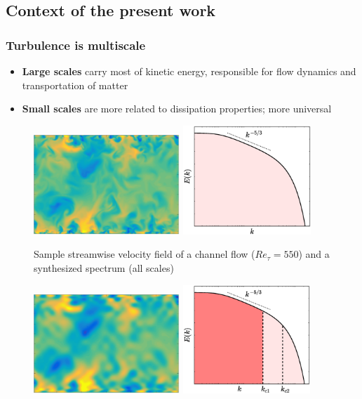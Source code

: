 \documentclass{beamer}
\let\olditem\item
\renewcommand{\item}{\setlength{\itemsep}{\fill}\olditem}
\begin{document}
\subsection[Context of the present work]{Context of the present work}
\begin{frame}
\frametitle{Turbulence is multiscale}
	\begin{itemize}
		\item \textbf{\color{red}Large scales} carry most of kinetic energy, responsible for flow dynamics and transportation of matter
		\item \textbf{\color{red}Small scales} are more related to dissipation properties; more universal
	\end{itemize}
	\begin{overprint}
	\begin{figure}
		\includegraphics[height=3.75cm,valign=t]{./figures/turbulence/Uorg.png}
		\includegraphics[height=4.1cm,valign=t]{./figures/turbulence/turbulence_spectra_allranges.eps}
		\caption*{Sample streamwise velocity field of a channel flow ($ Re_\tau = 550$) and a synthesized spectrum (all scales)}
	\end{figure}	
	\begin{figure}
		\includegraphics[height=3.75cm,valign=t]{./figures/turbulence/Ularge.png}
		\includegraphics[height=4.1cm,valign=t]{./figures/turbulence/turbulence_spectra_variousranges1.eps}

\end{figure}
\end{overprint}
\end{frame}
\end{document}
